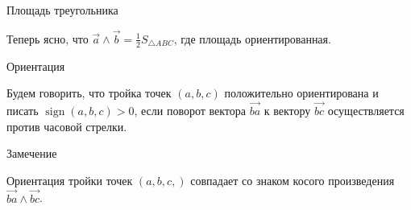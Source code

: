 \documentclass[12pt,aspectratio=169,svgnames]{beamer}
\DeclareMathOperator{\sign}{sign}
\begin{document}
\begin{frame}{Площадь треугольника}

	Теперь ясно, что $\vec{a} \wedge \vec{b} = \frac{1}{2} S_{\triangle{ABC}}$, где площадь \alert{ориентированная}.

	\begin{center}

	\end{center}

\end{frame}
\begin{frame}{Ориентация}

	\begin{defn}

		Будем говорить, что тройка точек $(a, b, c)$ \alert{положительно ориентирована} и писать $\sign(a, b, c) > 0$, если поворот вектора
		$\vec{ba}$ к вектору $\vec{bc}$ осуществляется против часовой стрелки.

	\end{defn}

	\begin{block}{Замечение}

		Ориентация тройки точек $(a, b, c,)$ совпадает со знаком косого произведения $\vec{ba} \wedge \vec{bc}$.

	\end{block}
\end{frame}
\end{document}
